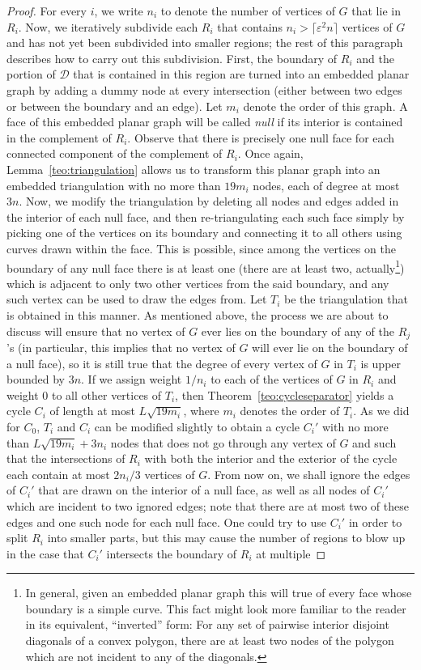 \documentclass{article}
\begin{document}
\begin{proof}
    
    For every $i$, we write $n_i$ to denote the number of vertices of $G$ that lie in $R_i$. Now, we iteratively subdivide each $R_i$ that contains $n_i>\lceil\varepsilon^2 n\rceil$ vertices of $G$ and has not yet been subdivided into smaller regions; the rest of this paragraph describes how to carry out this subdivision. First, the boundary of $R_i$ and the portion of $\mathcal D$ that is contained in this region are turned into an embedded planar graph by adding a dummy node at every intersection (either between two edges or between the boundary and an edge). Let $m_i$ denote the order of this graph. A face of this embedded planar graph will be called \textit{null} if its interior is contained in the complement of $R_i$. Observe that there is precisely one null face for each connected component of the complement of $R_i$. Once again, Lemma~\ref{teo:triangulation} allows us to transform this planar graph into an embedded triangulation with no more than $19m_i$ nodes, each of degree at most $3n$. Now, we modify the triangulation by deleting all nodes and edges added in the interior of each null face, and then re-triangulating each such face simply by picking one of the vertices on its boundary and connecting it to all others using curves drawn within the face. This is possible, since among the vertices on the boundary of any null face there is at least one (there are at least two, actually\footnote{In general, given an embedded planar graph this will true of every face whose boundary is a simple curve. This fact might look more familiar to the reader in its equivalent, ``inverted'' form: For any set of pairwise interior disjoint diagonals of a convex polygon, there are at least two nodes of the polygon which are not incident to any of the diagonals.}) which is adjacent to only two other vertices from the said boundary, and any such vertex can be used to draw the edges from. Let $T_i$ be the triangulation that is obtained in this manner. As mentioned above, the process we are about to discuss will ensure that no vertex of $G$ ever lies on the boundary of any of the $R_j$'s (in particular, this implies that no vertex of $G$ will ever lie on the boundary of a null face), so it is still true that the degree of every vertex of $G$ in $T_i$ is upper bounded by $3n$. If we assign weight $1/n_i$ to each of the vertices of $G$ in $R_i$ and weight $0$ to all other vertices of $T_i$, then Theorem~\ref{teo:cycleseparator} yields a cycle $C_i$ of length at most $L\sqrt{19m_i}$, where $m_i$ denotes the order of $T_i$. As we did for $C_0$, $T_i$ and $C_i$ can be modified slightly to obtain a cycle $C_i'$ with no more than $L\sqrt{19m_i}+3n_i$ nodes that does not go through any vertex of $G$ and such that the intersections of $R_i$ with both the interior and the exterior of the cycle each contain at most $2n_i/3$ vertices of $G$. From now on, we shall ignore the edges of $C_i'$ that are drawn on the interior of a null face, as well as all nodes of $C_i'$ which are incident to two ignored edges; note that there are at most two of these edges and one such node for each null face. One could try to use $C_i'$ in order to split $R_i$ into smaller parts, but this may cause the number of regions to blow up in the case that $C_i'$ intersects the boundary of $R_i$ at multiple 
\end{proof}
\end{document}
